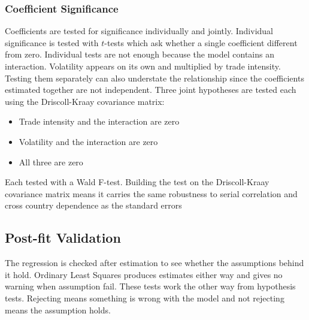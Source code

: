 \subsubsection{Coefficient Significance}\label{meth_coef}

Coefficients are tested for significance individually and jointly.
Individual significance is tested with $t$-tests which ask whether a single coefficient different from zero.
Individual tests are not enough because the model contains an interaction.
Volatility appears on its own and multiplied by trade intensity.
Testing them separately can also understate the relationship since the coefficients estimated together are not independent.
Three joint hypotheses are tested each using the Driscoll-Kraay covariance matrix:

\vspace{\baselineskip}

\begin{itemize}
    \item Trade intensity and the interaction are zero
    \item Volatility and the interaction are zero
    \item All three are zero
\end{itemize}
\vspace{\baselineskip}

Each tested with a Wald F-test.
Building the test on the Driscoll-Kraay covariance matrix means it carries the same robustness to serial correlation and cross country dependence as the standard errors
\subsection{Post-fit Validation}\label{post_fit}
The regression is checked after estimation to see whether the assumptions behind it hold.
Ordinary Least Squares produces estimates either way and gives no warning when assumption fail.
These tests work the other way from hypothesis tests.
Rejecting means something is wrong with the model and not rejecting means the assumption holds.

